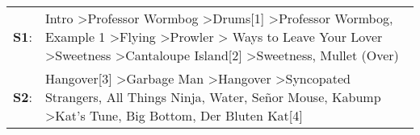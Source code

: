 \begin{supertabular}{p{0.03\textwidth}p{0.92\textwidth}}
 \textbf{S1}:  &  Intro\textsuperscript{} \textgreater \enspace Professor Wormbog\textsuperscript{} \textgreater \enspace Drums[1]\textsuperscript{} \textgreater \enspace Professor Wormbog\textsuperscript{}, \enspace Example 1\textsuperscript{} \textgreater \enspace Flying\textsuperscript{} \textgreater \enspace Prowler\textsuperscript{} \textgreater {} Ways to Leave Your Lover\textsuperscript{} \textgreater \enspace Sweetness\textsuperscript{} \textgreater \enspace Cantaloupe Island[2]\textsuperscript{} \textgreater \enspace Sweetness\textsuperscript{}, \enspace Mullet (Over)\textsuperscript{}  \enspace  \\
 \textbf{S2}:  &                                                                                                                 Hangover[3]\textsuperscript{} \textgreater \enspace Garbage Man\textsuperscript{} \textgreater \enspace Hangover\textsuperscript{} \textgreater \enspace Syncopated Strangers\textsuperscript{}, \enspace All Things Ninja\textsuperscript{}, \enspace Water\textsuperscript{}, \enspace Señor Mouse\textsuperscript{}, \enspace Kabump\textsuperscript{} \textgreater \enspace Kat's Tune\textsuperscript{}, \enspace Big Bottom\textsuperscript{}, \enspace Der Bluten Kat[4]\textsuperscript{}  \enspace  \\
\end{supertabular}
